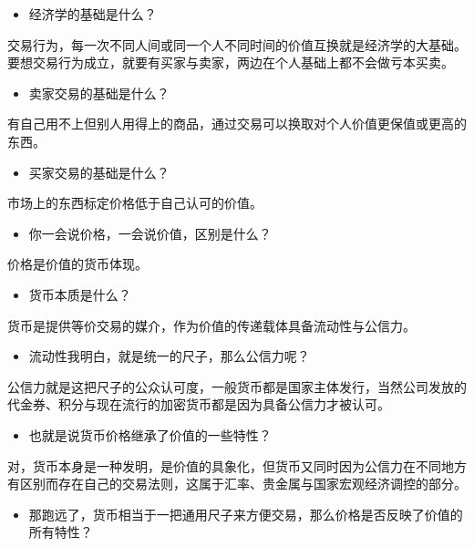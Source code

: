 \documentclass[
  letterpaper,
  DIV=11,
  numbers=noendperiod]{scrreprt}
\providecommand{\tightlist}{%
  \setlength{\itemsep}{0pt}\setlength{\parskip}{0pt}}\usepackage{longtable,booktabs,array}
\begin{document}
\begin{itemize}
\tightlist
\item
  经济学的基础是什么？
\end{itemize}

交易行为，每一次不同人间或同一个人不同时间的价值互换就是经济学的大基础。要想交易行为成立，就要有买家与卖家，两边在个人基础上都不会做亏本买卖。

\begin{itemize}
\tightlist
\item
  卖家交易的基础是什么？
\end{itemize}

有自己用不上但别人用得上的商品，通过交易可以换取对个人价值更保值或更高的东西。

\begin{itemize}
\tightlist
\item
  买家交易的基础是什么？
\end{itemize}

市场上的东西标定价格低于自己认可的价值。

\begin{itemize}
\tightlist
\item
  你一会说价格，一会说价值，区别是什么？
\end{itemize}

价格是价值的货币体现。

\begin{itemize}
\tightlist
\item
  货币本质是什么？
\end{itemize}

货币是提供等价交易的媒介，作为价值的传递载体具备流动性与公信力。

\begin{itemize}
\tightlist
\item
  流动性我明白，就是统一的尺子，那么公信力呢？
\end{itemize}

公信力就是这把尺子的公众认可度，一般货币都是国家主体发行，当然公司发放的代金券、积分与现在流行的加密货币都是因为具备公信力才被认可。

\begin{itemize}
\tightlist
\item
  也就是说货币价格继承了价值的一些特性？
\end{itemize}

对，货币本身是一种发明，是价值的具象化，但货币又同时因为公信力在不同地方有区别而存在自己的交易法则，这属于汇率、贵金属与国家宏观经济调控的部分。

\begin{itemize}
\tightlist
\item
  那跑远了，货币相当于一把通用尺子来方便交易，那么价格是否反映了价值的所有特性？
\end{itemize}
\end{document}

